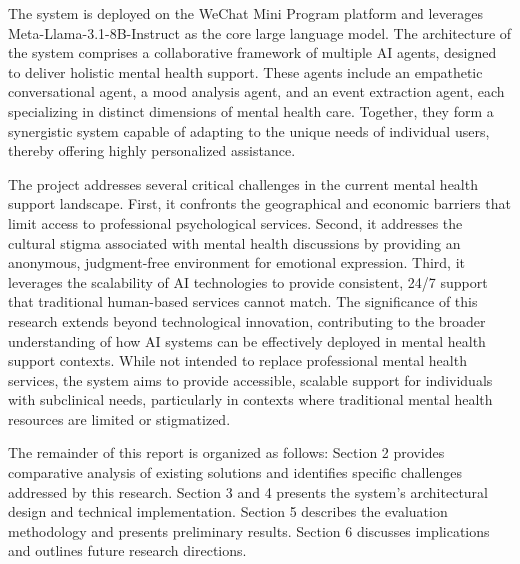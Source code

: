  The system is deployed on the WeChat Mini Program platform and leverages Meta-Llama-3.1-8B-Instruct as the core large language model. The architecture of the system comprises a collaborative framework of multiple AI agents, designed to deliver holistic mental health support. These agents include an empathetic conversational agent, a mood analysis agent, and an event extraction agent, each specializing in distinct dimensions of mental health care. Together, they form a synergistic system capable of adapting to the unique needs of individual users, thereby offering highly personalized assistance.

The project addresses several critical challenges in the current mental health support landscape. First, it confronts the geographical and economic
barriers that limit access to professional psychological services. Second, it addresses the cultural stigma associated with mental health discussions by
providing an anonymous, judgment-free environment for emotional expression. Third, it leverages the scalability of AI technologies to provide consistent, 24/7 support that traditional human-based services cannot match. The significance of this research extends beyond technological innovation, contributing to the broader understanding of how AI systems can be effectively deployed in mental health support contexts. While not intended to replace professional mental health services, the system aims to provide accessible, scalable support for individuals with subclinical needs, particularly in contexts where traditional mental health resources are limited or stigmatized.

The remainder of this report is organized as follows: Section 2 provides comparative analysis of existing solutions and identifies specific challenges addressed by this research. Section 3 and 4 presents the system's architectural design and technical implementation. Section 5 describes the evaluation methodology and presents preliminary results. Section 6 discusses implications and outlines future research directions.